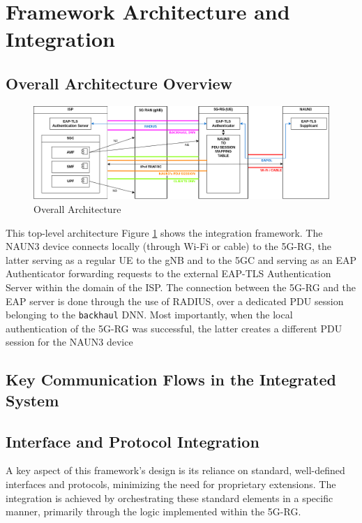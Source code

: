 \section{Framework Architecture and Integration}

\subsection{Overall Architecture Overview}

\begin{figure}
    \centering
    \includegraphics[width=1\linewidth]{figs/overall-topology.png}
    \caption{Overall Architecture}
    \label{fig:Overall Architecture}
\end{figure}

This top-level architecture Figure \ref{fig:Overall Architecture} shows the integration framework. The \ac{NAUN3} device connects locally (through Wi-Fi or cable) to the \ac{5G-RG}, the latter serving as a regular \ac{UE} to the \ac{gNB} and to the \ac{5GC} and serving as an \ac{EAP} Authenticator forwarding requests to the external \ac{EAP-TLS} Authentication Server within the domain of the \ac{ISP}. The connection between the \ac{5G-RG} and the \ac{EAP} server is done through the use of \ac{RADIUS}, over a dedicated \ac{PDU} session belonging to the \texttt{backhaul} \ac{DNN}. Most importantly, when the local authentication of the \ac{5G-RG} was successful, the latter creates a different \ac{PDU} session for the \ac{NAUN3} device

\subsection{Key Communication Flows in the Integrated System}

\subsection{Interface and Protocol Integration}

A key aspect of this framework's design is its reliance on standard, well-defined interfaces and protocols, minimizing the need for proprietary extensions. The integration is achieved by orchestrating these standard elements in a specific manner, primarily through the logic implemented within the \ac{5G-RG}.

